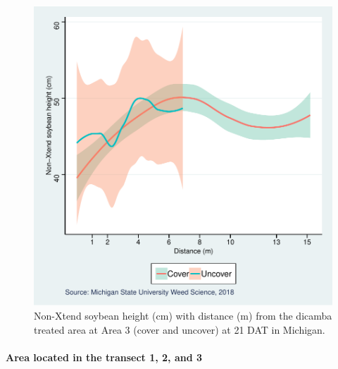 \documentclass[]{article}
\let\oldparagraph\paragraph
\renewcommand{\paragraph}[1]{\oldparagraph{#1}\mbox{}}
\begin{document}
\begin{figure}
\centering
\includegraphics{Report_files/figure-latex/unnamed-chunk-63-1.pdf}
\caption{Non-Xtend soybean height (cm) with distance (m) from the
dicamba treated area at Area 3 (cover and uncover) at 21 DAT in
Michigan.}
\end{figure}

\pagebreak
\newpage

\paragraph{\texorpdfstring{Area located in the \textbf{transect} 1, 2,
and
3}{Area located in the transect 1, 2, and 3}}\label{area-located-in-the-transect-1-2-and-3-1}
\end{document}
